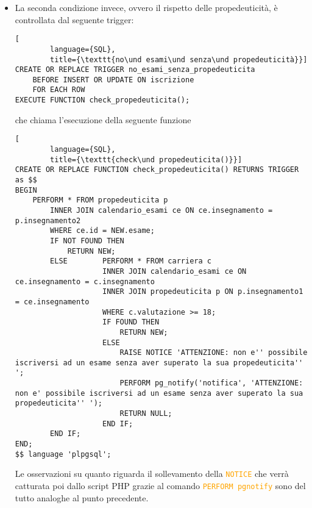 \documentclass{article}
\newcommand{\sqlcommand}[1]{\texttt{\textcolor{orange}{#1}}}
\newcommand{\und}[0]{\textunderscore}
\begin{document}
\begin{itemize}
\begin{itemize}
        \item a livello di funzionalità, la funzione contiene anche i messaggi di informazione:
        \begin{itemize}
            \item la \sqlcommand{NOTICE} verrà mostrata come messaggio se la funzione viene chiamata da terminale
            \item il comando \sqlcommand{PERFORM pg\und notify} invece genererà una notifica che potrà essere catturata dal linguaggio di scripting PHP
        \end{itemize}
    \end{itemize}

    \item La seconda condizione invece, ovvero il rispetto delle propedeuticità, è controllata dal seguente trigger:
    \begin{lstlisting}[
        language={SQL},
        title={\texttt{no\und esami\und senza\und propedeuticità}}]
CREATE OR REPLACE TRIGGER no_esami_senza_propedeuticita
    BEFORE INSERT OR UPDATE ON iscrizione
    FOR EACH ROW
EXECUTE FUNCTION check_propedeuticita();
    \end{lstlisting}

    che chiama l'esecuzione della seguente funzione

    \begin{lstlisting}[
        language={SQL},
        title={\texttt{check\und propedeuticita()}}]
CREATE OR REPLACE FUNCTION check_propedeuticita() RETURNS TRIGGER as $$
BEGIN
    PERFORM * FROM propedeuticita p
        INNER JOIN calendario_esami ce ON ce.insegnamento = p.insegnamento2
        WHERE ce.id = NEW.esame;
        IF NOT FOUND THEN
            RETURN NEW;
        ELSE        PERFORM * FROM carriera c
                    INNER JOIN calendario_esami ce ON ce.insegnamento = c.insegnamento
                    INNER JOIN propedeuticita p ON p.insegnamento1 = ce.insegnamento
                    WHERE c.valutazione >= 18;
                    IF FOUND THEN
                        RETURN NEW;
                    ELSE
                        RAISE NOTICE 'ATTENZIONE: non e'' possibile iscriversi ad un esame senza aver superato la sua propedeuticita'' ';
                        PERFORM pg_notify('notifica', 'ATTENZIONE: non e' possibile iscriversi ad un esame senza aver superato la sua propedeuticita'' ');
                        RETURN NULL;
                    END IF;
        END IF;
END;
$$ language 'plpgsql';
    \end{lstlisting}
    Le osservazioni su quanto riguarda il sollevamento della \sqlcommand{NOTICE} che verrà catturata poi dallo script PHP grazie al comando \sqlcommand{PERFORM pg\und notify} sono del tutto analoghe al punto precedente.
\end{itemize}
\end{document}
